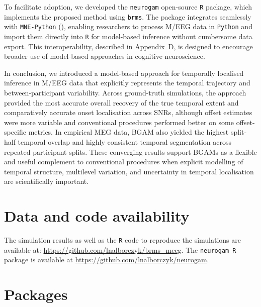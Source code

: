 \documentclass[
  doc,
  floatsintext,
  longtable,
  a4paper,
  nolmodern,
  notxfonts,
  notimes,
  colorlinks=true,linkcolor=blue,citecolor=blue,urlcolor=blue]{apa7}
\begin{document}
To facilitate adoption, we developed the \texttt{neurogam} open-source
\texttt{R} package, which implements the proposed method using
\texttt{brms}. The package integrates seamlessly with
\texttt{MNE-Python} (),
enabling researchers to process M/EEG data in \texttt{Python} and import
them directly into \texttt{R} for model-based inference without
cumbersome data export. This interoperability, described in
\hyperref[apx-package]{Appendix~D}, is designed to encourage broader use
of model-based approaches in cognitive neuroscience.

In conclusion, we introduced a model-based approach for temporally
localised inference in M/EEG data that explicitly represents the
temporal trajectory and between-participant variability. Across
ground-truth simulations, the approach provided the most accurate
overall recovery of the true temporal extent and comparatively accurate
onset localisation across SNRs, although offset estimates were more
variable and conventional procedures performed better on some
offset-specific metrics. In empirical MEG data, BGAM also yielded the
highest split-half temporal overlap and highly consistent temporal
segmentation across repeated participant splits. These converging
results support BGAMs as a flexible and useful complement to
conventional procedures when explicit modelling of temporal structure,
multilevel variation, and uncertainty in temporal localisation are
scientifically important.

\setcounter{secnumdepth}{0}

\newpage

\section{Data and code availability}\label{data-and-code-availability}

The simulation results as well as the \texttt{R} code to reproduce the
simulations are available at:
\url{https://github.com/lnalborczyk/brms_meeg}. The \texttt{neurogam\ R}
package is available at \url{https://github.com/lnalborczyk/neurogam}.

\section{Packages}\label{packages}
\end{document}
